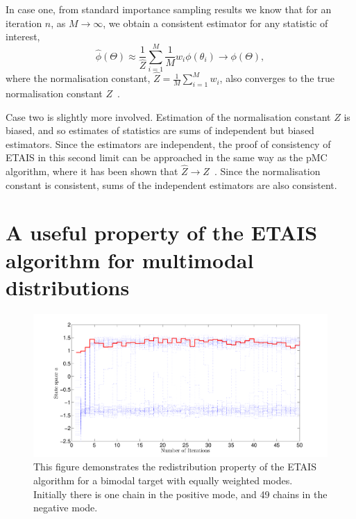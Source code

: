 \documentclass[final]{siamltex}
\newcommand{\revised}{}
\begin{document}
In case one, from standard importance sampling results we know that for an iteration $n$, as $M\rightarrow\infty$, we obtain a consistent estimator for any statistic of interest,
\[
	\hat{\phi}(\Theta) \approx \frac{1}{\hat{Z}}\sum\limits_{i=1}^M \! \frac{1}{M}w_i\phi(\theta_i) \rightarrow \phi(\Theta),
\]
where the normalisation constant, $\hat{Z} = \frac{1}{M}\sum_{i=1}^M \! w_i$, also converges to the true normalisation constant $Z$~\cite{robert2013monte}.

Case two is slightly more involved. Estimation of the normalisation constant $Z$ is biased, and so estimates of statistics are sums of independent but biased estimators. Since the estimators are independent, the proof of consistency of ETAIS in this second limit can be approached in the same way as the pMC algorithm, where it has been shown that $\hat{Z}\rightarrow Z$~\cite{robert2013monte}. Since the normalisation constant is consistent, sums of the independent estimators are also consistent.


\section{{\revised A useful property of the ETAIS algorithm for multimodal
  distributions } }\label{sec:useful}

\begin{figure}[!ht]
\begin{center}
\includegraphics[width=\textwidth]{"figures/BM2_suction"}
\caption{This figure demonstrates the redistribution property of the
ETAIS algorithm for a bimodal target with equally weighted modes. Initially there is one chain in the positive mode, and
49 chains in the negative mode.}
\label{fig:BM2_suction}
\end{center}
\end{figure}
\end{document}
